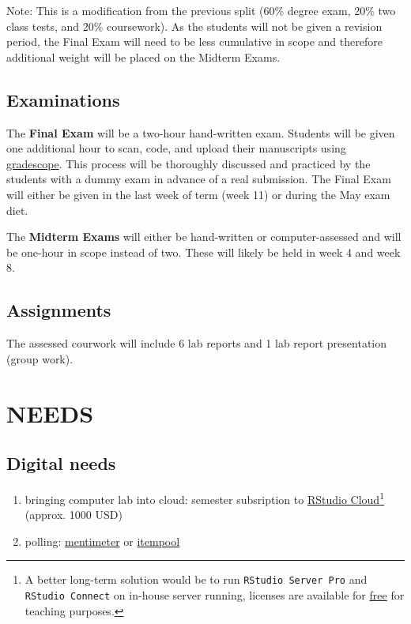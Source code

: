 \documentclass[
]{article}
\providecommand{\tightlist}{%
  \setlength{\itemsep}{0pt}\setlength{\parskip}{0pt}}
\begin{document}
Note: This is a modification from the previous split (60\% degree exam, 20\% two
class tests, and 20\% coursework). As the students will not be given a revision period, the Final Exam will need to be less cumulative in scope and therefore additional weight will be placed on the Midterm Exams.

\hypertarget{examinations}{%
\subsection*{Examinations}\label{examinations}}

The \textbf{Final Exam} will be a two-hour hand-written exam. Students will be given one additional hour to scan, code, and upload their manuscripts using \href{https://www.gradescope.com/}{gradescope}. This process will be thoroughly discussed and practiced by the students with a dummy exam in advance of a real submission. The Final Exam will either be given in the last week of term (week 11) or during the May exam diet.

The \textbf{Midterm Exams} will either be hand-written or computer-assessed and will be one-hour in scope instead of two. These will likely be held in week 4 and week 8.

\hypertarget{assignments}{%
\subsection*{Assignments}\label{assignments}}

The assessed courwork will include 6 lab reports and 1 lab report presentation (group work).

\hypertarget{needs}{%
\section{NEEDS}\label{needs}}

\hypertarget{digital-needs}{%
\subsection*{Digital needs}\label{digital-needs}}

\begin{enumerate}
\def\labelenumi{\arabic{enumi}.}
\tightlist
\item
  bringing computer lab into cloud: semester subsription to \href{https://rstudio.cloud/}{RStudio Cloud}\footnote{A better long-term solution would be to run \texttt{RStudio\ Server\ Pro} and \texttt{RStudio\ Connect} on in-house server running, licenses are available for \href{https://rstudio.com/pricing/academic-pricing/}{free} for teaching purposes.} (approx. 1000 USD)
\item
  polling: \href{https://www.mentimeter.com/}{mentimeter} or \href{https://itempool.com/}{itempool}
\end{enumerate}
\end{document}

